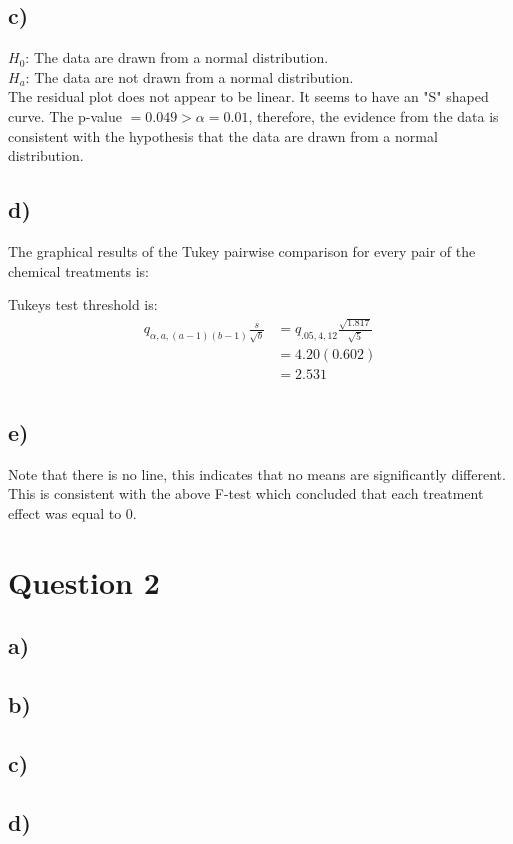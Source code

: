 \documentclass{article}
\begin{document}
\subsection*{c)}
$H_0$: The data are drawn from a normal distribution. \\
$H_a$: The data are not drawn from a normal distribution.\\
The residual plot does not appear to be linear. It seems to have an "S" shaped curve. The p-value $= 0.049 > \alpha = 0.01$, therefore, 
the evidence from the data is consistent with the hypothesis that the data are drawn from a normal distribution.
\subsection*{d)}
The graphical results of the Tukey pairwise comparison for every pair of the chemical treatments is:
\\

Tukeys test threshold is:
\begin{align*}
    q_{\alpha, a, (a-1)(b-1)} \frac{s}{\sqrt{b}} &= q_{.05, 4, 12} \frac{\sqrt{1.817}}{\sqrt{5}}  \\
                                                 &= 4.20 (0.602)  \\
                                                 &= 2.531  \\
\end{align*}


\subsection*{e)}
Note that there is no line, this indicates that no means are significantly different. This is consistent with the above F-test which concluded that each treatment effect was equal to 0.


\section*{Question 2}
\subsection*{a)}
\subsection*{b)}
\subsection*{c)}
\subsection*{d)}
\end{document}
